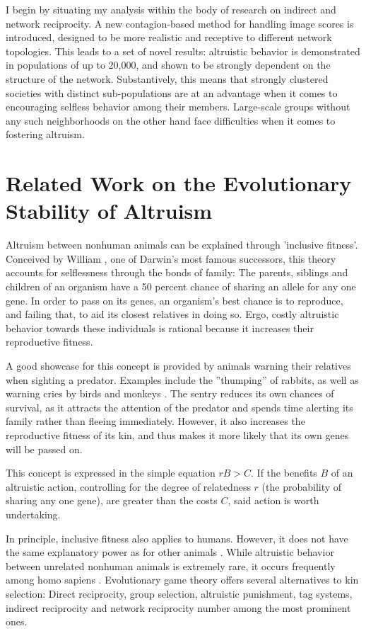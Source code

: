 \documentclass{JASSS}
\begin{document}
I begin by situating my analysis within the body of research on indirect and network reciprocity. A new contagion-based method for handling image scores is introduced, designed to be more realistic and receptive to different network topologies. This leads to a set of novel results: altruistic behavior is demonstrated in populations of up to 20,000, and shown to be strongly dependent on the structure of the network. Substantively, this means that strongly clustered societies with distinct sub-populations are at an advantage when it comes to encouraging selfless behavior among their members. Large-scale groups without any such neighborhoods on the other hand face difficulties when it comes to fostering altruism.

\section{Related Work on the Evolutionary Stability of Altruism}
Altruism between nonhuman animals can be explained through 'inclusive fitness'. Conceived by William \cite{Hamilton1964}, one of Darwin's most famous successors, this theory accounts for selflessness through the bonds of family: The parents, siblings and children of an organism have a 50 percent chance of sharing an allele for any one gene. In order to pass on its genes, an organism's best chance is to reproduce, and failing that, to aid its closest relatives in doing so. Ergo, costly altruistic behavior towards these individuals is rational because it increases their reproductive fitness.

A good showcase for this concept is provided by animals warning their relatives when sighting a predator. Examples include the ''thumping'' of rabbits, as well as warning cries by birds and monkeys \citep{hamilton1964_2}. The sentry reduces its own chances of survival, as it attracts the attention of the predator and spends time alerting its family rather than fleeing immediately. However, it also increases the reproductive fitness of its kin, and thus makes it more likely that its own genes will be passed on.

This concept is expressed in the simple equation $rB > C$. If the benefits $B$ of an altruistic action, controlling for the degree of relatedness $r$ (the probability of sharing any one gene), are greater than the costs $C$, said action is worth undertaking.

In principle, inclusive fitness also applies to humans. However, it does not have the same explanatory power as for other animals \citep{Abbot2013}. While altruistic behavior between unrelated nonhuman animals is extremely rare, it occurs frequently among homo sapiens \citep{Axelrod1981,Fehr2002}. Evolutionary game theory offers several alternatives to kin selection: Direct reciprocity, group selection, altruistic punishment, tag systems, indirect reciprocity and network reciprocity number among the most prominent ones.
\end{document}
